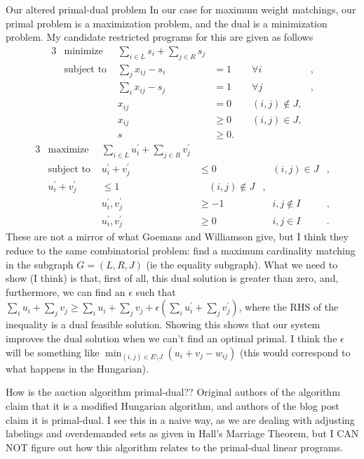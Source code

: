 \documentclass[11pt]{article}
\renewcommand{\'}{^{'}}
\begin{document}
\begin{section}{Our altered primal-dual problem}
	In our case for maximum weight matchings, our primal problem is a maximization problem, and 
	the dual is a minimization problem. My candidate restricted programs for this are given 
	as follows
	\begin{alignat}{3}
		& \text{minimize } & \sum_{i\in L} s_i + \sum_{j\in R} s_j & \\
		& \text{subject to } & \sum_j x_{ij} - s_i & = 1 & \quad \forall i &, \\
				     && \sum_i x_{ij} - s_j & = 1 & \quad \forall j &, \\
				     && x_{ij} & = 0 & \quad (i,j)\notin J, \\
				     && x_{ij} & \geq 0 & \quad (i,j)\in J, \\
				     && s & \geq 0.
	\end{alignat}
	\begin{alignat}{3}
		& \text{maximize } & \sum_{i\in L} u_{i}^{'} + \sum_{j\in R} v_{j}^{'} & \\
		& \text{subject to } & u_i^{'} + v_j^{'} & \leq 0 & \quad (i,j)\in J &, \\
				     & u_i^{'} + v_j^{'} & \leq 1 & \quad (i,j)\notin J &, \\
				     && u_i^{'},v_j^{'} &\geq -1 & \quad i,j\notin I &, \\ 
				     && u_{i}^{'},v_j^{'} &\geq 0 & \quad i,j\in I &.
	\end{alignat}
	These are not a mirror of what Goemans and Williamson give, but I think they reduce to the 
	same combinatorial problem: find a maximum cardinality matching in the subgraph $G = (L,R,J)$ 
	(ie the equality subgraph). What we need to show (I think) is that, first of all, this dual 
	solution is greater than zero, and, furthermore, we can find an $\epsilon$ such that 
	$\sum_i u_i + \sum_j v_j \geq \sum_i u_i + \sum_j v_j + \epsilon (\sum_i u_i^{'} + \sum_j 
	v_j^{'})$, where the RHS of the inequality is a dual feasible solution. Showing this shows that 
	our system improves the dual solution when we can't find an optimal primal. I think the 
	$\epsilon$ will be something like $\min_{(i,j)\in E\setminus J} (u_i + v_j - w_{ij})$ (this 
	would correspond to what happens in the Hungarian).
\end{section}
\begin{section}{How is the auction algorithm primal-dual??}
	Original authors of the algorithm claim that it is a modified Hungarian algorithm, and authors 
	of the blog post claim it is primal-dual. I see this in a naive way, as we are dealing with 
	adjusting labelings and overdemanded sets as given in Hall's Marriage Theorem, but I CAN NOT 
	figure out how this algorithm relates to the primal-dual linear programs.
\end{section}
\end{document}
